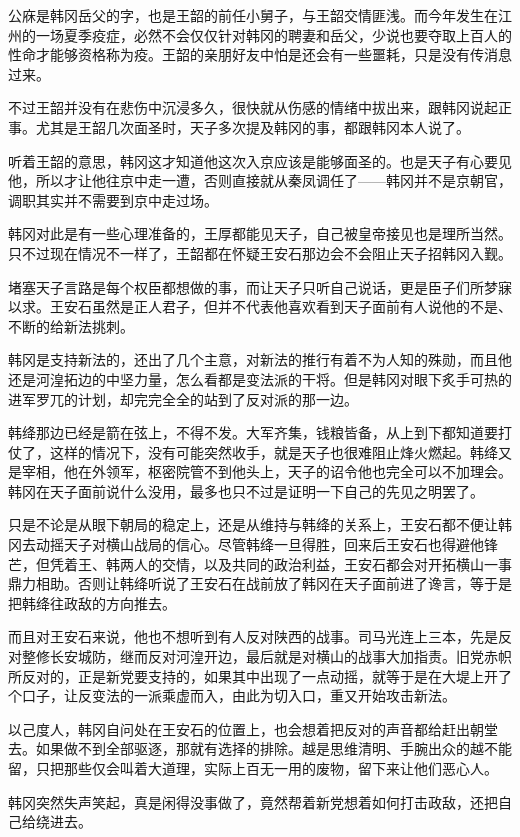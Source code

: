 公庥是韩冈岳父的字，也是王韶的前任小舅子，与王韶交情匪浅。而今年发生在江州的一场夏季疫症，必然不会仅仅针对韩冈的聘妻和岳父，少说也要夺取上百人的性命才能够资格称为疫。王韶的亲朋好友中怕是还会有一些噩耗，只是没有传消息过来。

不过王韶并没有在悲伤中沉浸多久，很快就从伤感的情绪中拔出来，跟韩冈说起正事。尤其是王韶几次面圣时，天子多次提及韩冈的事，都跟韩冈本人说了。

听着王韶的意思，韩冈这才知道他这次入京应该是能够面圣的。也是天子有心要见他，所以才让他往京中走一遭，否则直接就从秦凤调任了——韩冈并不是京朝官，调职其实并不需要到京中走过场。

韩冈对此是有一些心理准备的，王厚都能见天子，自己被皇帝接见也是理所当然。只不过现在情况不一样了，王韶都在怀疑王安石那边会不会阻止天子招韩冈入觐。

堵塞天子言路是每个权臣都想做的事，而让天子只听自己说话，更是臣子们所梦寐以求。王安石虽然是正人君子，但并不代表他喜欢看到天子面前有人说他的不是、不断的给新法挑刺。

韩冈是支持新法的，还出了几个主意，对新法的推行有着不为人知的殊勋，而且他还是河湟拓边的中坚力量，怎么看都是变法派的干将。但是韩冈对眼下炙手可热的进军罗兀的计划，却完完全全的站到了反对派的那一边。

韩绛那边已经是箭在弦上，不得不发。大军齐集，钱粮皆备，从上到下都知道要打仗了，这样的情况下，没有可能突然收手，就是天子也很难阻止烽火燃起。韩绛又是宰相，他在外领军，枢密院管不到他头上，天子的诏令他也完全可以不加理会。韩冈在天子面前说什么没用，最多也只不过是证明一下自己的先见之明罢了。

只是不论是从眼下朝局的稳定上，还是从维持与韩绛的关系上，王安石都不便让韩冈去动摇天子对横山战局的信心。尽管韩绛一旦得胜，回来后王安石也得避他锋芒，但凭着王、韩两人的交情，以及共同的政治利益，王安石都会对开拓横山一事鼎力相助。否则让韩绛听说了王安石在战前放了韩冈在天子面前进了谗言，等于是把韩绛往政敌的方向推去。

而且对王安石来说，他也不想听到有人反对陕西的战事。司马光连上三本，先是反对整修长安城防，继而反对河湟开边，最后就是对横山的战事大加指责。旧党赤帜所反对的，正是新党要支持的，如果其中出现了一点动摇，就等于是在大堤上开了个口子，让反变法的一派乘虚而入，由此为切入口，重又开始攻击新法。

以己度人，韩冈自问处在王安石的位置上，也会想着把反对的声音都给赶出朝堂去。如果做不到全部驱逐，那就有选择的排除。越是思维清明、手腕出众的越不能留，只把那些仅会叫着大道理，实际上百无一用的废物，留下来让他们恶心人。

韩冈突然失声笑起，真是闲得没事做了，竟然帮着新党想着如何打击政敌，还把自己给绕进去。

